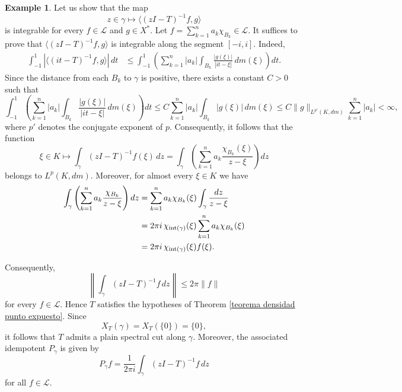 \documentclass[11pt]{amsart}
\theoremstyle{definition}
\newtheorem{example}[theorem]{Example}
\theoremstyle{remark}
\numberwithin{equation}{section}
\newcommand{\pe}[1]{\langle#1\rangle}
\newcommand{\EL}{\mathcal{L}}
\newcommand{\inte}{\textnormal{int}}
\begin{document}
\begin{example}
Let us show that the map
$$
z\in \gamma \longmapsto \pe{(zI-T)^{-1}f,g}
$$
is integrable for every $f\in \mathcal{L}$ and $g\in X^*$. Let
$f=\sum_{k=1}^n a_k \chi_{B_k}\in \mathcal{L}$. It suffices to prove that
$\pe{(zI-T)^{-1}f,g}$ is integrable along the segment $[-i,i]$. Indeed,
\begin{equation*}
\begin{split}
\int_{-1}^1 \left|\pe{(it-T)^{-1}f,g}\right|\,dt
&\le \int_{-1}^1 \left( \sum_{k=1}^n |a_k|
\int_{B_k} \frac{|g(\xi)|}{|it-\xi|}\,dm(\xi) \right) dt .
\end{split}
\end{equation*}
Since the distance from each $B_k$ to $\gamma$ is positive, there exists a constant
$C>0$ such that
$$
\int_{-1}^1 \left( \sum_{k=1}^n |a_k|
\int_{B_k} \frac{|g(\xi)|}{|it-\xi|}\,dm(\xi) \right) dt
\le C \sum_{k=1}^n |a_k| \int_{B_k} |g(\xi)|\,dm(\xi)
\le C \|g\|_{L^{p'}(K,dm)} \sum_{k=1}^n |a_k| < \infty,
$$
where $p'$ denotes the conjugate exponent of $p$. Consequently, it follows that the function
$$
\xi \in K \longmapsto \int_\gamma (zI-T)^{-1}f(\xi)\,dz
= \int_\gamma \left(\sum_{k=1}^n a_k \frac{\chi_{B_k}(\xi)}{z-\xi}\right) dz
$$
belongs to $L^p(K,dm)$. Moreover, for almost every $\xi\in K$ we have
\begin{equation*}
\begin{split}
\int_\gamma \left(\sum_{k=1}^n a_k \frac{\chi_{B_k}}{z-\xi}\right)dz
&= \sum_{k=1}^n a_k \chi_{B_k}(\xi)\int_\gamma \frac{dz}{z-\xi} \\
&= 2\pi i\,\chi_{\inte(\gamma)}(\xi)\sum_{k=1}^n a_k \chi_{B_k}(\xi) \\
&= 2\pi i\,\chi_{\inte(\gamma)}(\xi) f(\xi).
\end{split}
\end{equation*}

\noindent Consequently,
$$
\left\|\int_\gamma (zI-T)^{-1}f\,dz\right\|
\le 2\pi\|f\|
$$
for every $f\in \EL$. Hence $T$ satisfies the hypotheses of Theorem \ref{teorema densidad punto expuesto}. Since
$$
X_T(\gamma)=X_T(\{0\})=\{0\},
$$
it follows that $T$ admits a plain spectral cut along $\gamma$. Moreover, the associated idempotent $P_\gamma$ is given by
$$
P_\gamma f=\frac{1}{2\pi i}\int_\gamma (zI-T)^{-1}f\,dz
$$
for all $f\in \EL$.
\end{example}


\medskip
\end{document}

